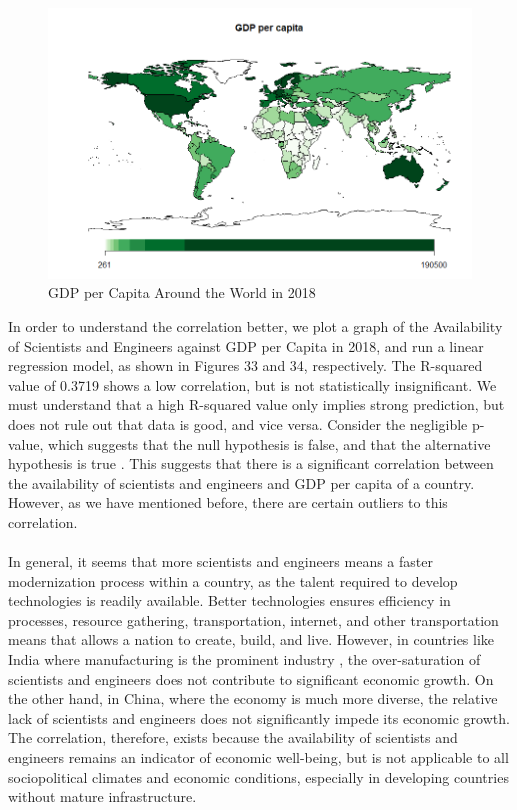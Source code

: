 \documentclass[15pt]{article}
\begin{document}
\begin{figure}[H]
    \centering
    \includegraphics[scale = 0.7]{Part6_gdp_map.png}
    \caption{GDP per Capita Around the World in 2018}
\end{figure}
\noindent
In order to understand the correlation better, we plot a graph of the Availability of Scientists and Engineers against GDP per Capita in 2018, and run a linear regression model, as shown in Figures 33 and 34, respectively. The R-squared value of 0.3719 shows a low correlation, but is not statistically insignificant. We must understand that a high R-squared value only implies strong prediction, but does not rule out that data is good, and vice versa. Consider the negligible p-value, which suggests that the null hypothesis is false, and that the alternative hypothesis is true \cite{21}. This suggests that there is a significant correlation between the availability of scientists and engineers and GDP per capita of a country. However, as we have mentioned before, there are certain outliers to this correlation. \\
\\In general, it seems that more scientists and engineers means a faster modernization process within a country, as the talent required to develop technologies is readily available. Better technologies ensures efficiency in processes, resource gathering, transportation, internet, and other transportation means that allows a nation to create, build, and live. However, in countries like India where manufacturing is the prominent industry \cite{22}, the over-saturation of scientists and engineers does not contribute to significant economic growth. On the other hand, in China, where the economy is much more diverse, the relative lack of scientists and engineers does not significantly impede its economic growth. The correlation, therefore, exists because the availability of scientists and engineers remains an indicator of economic well-being, but is not applicable to all sociopolitical climates and economic conditions, especially in developing countries without mature infrastructure.
\end{document}
